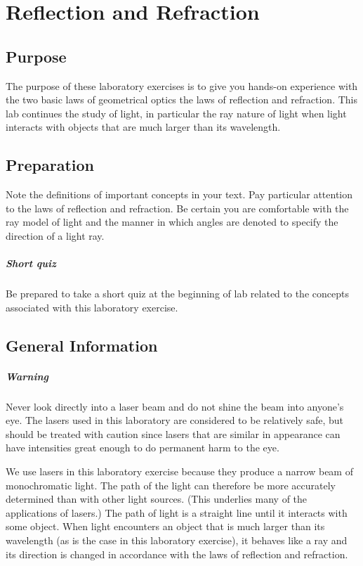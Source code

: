 \chapter{Reflection and Refraction}

\section{Purpose}
  The purpose of these laboratory exercises is to give you hands-on experience with the two basic laws of geometrical optics the laws of reflection and refraction. This lab continues the study of light, in particular the ray nature of light when light interacts with objects that are much larger than its wavelength.
  
\section{Preparation}
Note the definitions of important concepts in your text.  Pay particular attention to the laws of reflection and refraction.  Be certain you are comfortable with the ray model of light and the manner in which angles are denoted to specify the direction of a light ray.
\paragraph{Short quiz}
  Be prepared to take a short quiz at the beginning of lab related to the concepts associated with this laboratory exercise.
\section{General Information}

\paragraph{Warning}
  Never look directly into a laser beam and do not shine the beam into anyone's eye.  The lasers used in this laboratory are considered to be relatively safe, but should be treated with caution since lasers that are similar in appearance can have intensities great enough to do permanent harm to the eye.  
  
We use lasers in this laboratory exercise because they produce a narrow beam of monochromatic light.  The path of the light can therefore be more accurately determined than with other light sources.  (This underlies many of the applications of lasers.)  The path of light is a straight line until it interacts with some object.  When light encounters an object that is much larger than its wavelength  (as is the case in this laboratory exercise), it behaves like a ray and its direction is changed in accordance with the laws of reflection and refraction.
 
